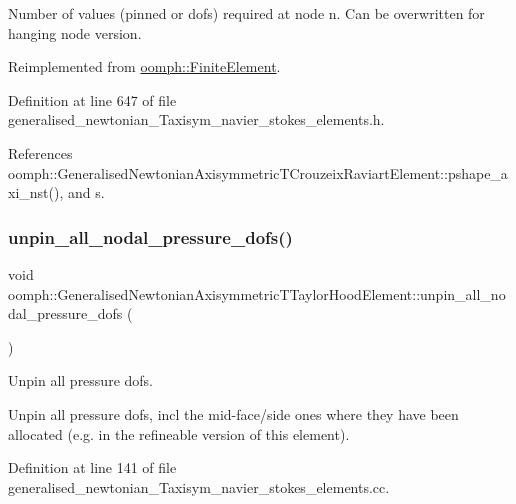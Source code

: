 Number of values (pinned or dofs) required at node n. Can be overwritten for hanging node version. 



Reimplemented from \hyperlink{classoomph_1_1FiniteElement_a56610c60d5bc2d7c27407a1455471b1a}{oomph\+::\+Finite\+Element}.



Definition at line 647 of file generalised\+\_\+newtonian\+\_\+\+Taxisym\+\_\+navier\+\_\+stokes\+\_\+elements.\+h.



References oomph\+::\+Generalised\+Newtonian\+Axisymmetric\+T\+Crouzeix\+Raviart\+Element\+::pshape\+\_\+axi\+\_\+nst(), and s.

\mbox{\label{classoomph_1_1GeneralisedNewtonianAxisymmetricTTaylorHoodElement_a951b5516cd3374730d55a8369d49a4fa}} 
\subsubsection{\texorpdfstring{unpin\+\_\+all\+\_\+nodal\+\_\+pressure\+\_\+dofs()}{unpin\_all\_nodal\_pressure\_dofs()}}
{\footnotesize\ttfamily void oomph\+::\+Generalised\+Newtonian\+Axisymmetric\+T\+Taylor\+Hood\+Element\+::unpin\+\_\+all\+\_\+nodal\+\_\+pressure\+\_\+dofs (\begin{DoxyParamCaption}{ }\end{DoxyParamCaption})\hspace{0.3cm}{\ttfamily [protected]}}



Unpin all pressure dofs. 

Unpin all pressure dofs, incl the mid-\/face/side ones where they have been allocated (e.\+g. in the refineable version of this element). 

Definition at line 141 of file generalised\+\_\+newtonian\+\_\+\+Taxisym\+\_\+navier\+\_\+stokes\+\_\+elements.\+cc.



